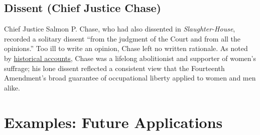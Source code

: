 \documentclass[12pt]{article}
\begin{document}
\subsection{Dissent (Chief Justice Chase)}

Chief Justice Salmon P. Chase, who had also dissented in \textit{Slaughter-House}, recorded a solitary dissent ``from the judgment of the Court and from all the opinions.'' Too ill to write an opinion, Chase left no written rationale. As noted by \href{https://en.wikipedia.org/wiki/Bradwell_v._Illinois}{historical accounts}, Chase was a lifelong abolitionist and supporter of women's suffrage; his lone dissent reflected a consistent view that the Fourteenth Amendment's broad guarantee of occupational liberty applied to women and men alike.

\section{Examples: Future Applications}
\end{document}
